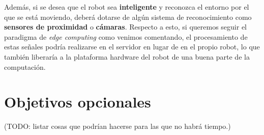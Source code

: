 Además, si se desea que el robot sea \textbf{inteligente} y reconozca el entorno por el que se está moviendo, deberá dotarse de algún sistema de reconocimiento como \textbf{sensores de proximidad} o \textbf{cámaras}. Respecto a esto, si queremos seguir el paradigma de \textit{edge computing} como venimos comentando, el procesamiento de estas señales podría realizarse en el servidor en lugar de en el propio robot, lo que también liberaría a la plataforma hardware del robot de una buena parte de la computación.\\


\section{Objetivos opcionales}

(TODO: listar cosas que podrían hacerse para las que no habrá tiempo.)
